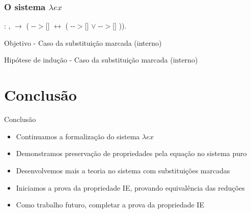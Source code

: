 \documentclass{beamer}
\begin{document}
\begin{frame}
\frametitle{O sistema $\lambda ex$}
    

     :
    \coqdockw{\ensuremath{\forall}}  ,
      \ensuremath{\rightarrow} (
    -{}-$>$[]  \ensuremath{\leftrightarrow} (
    -{}-$>$[]  \ensuremath{\lor} 
    -{}-$>$[] )).


\begin{block}{Objetivo - Caso da substituição marcada (interno)}
\end{block}



\begin{block}{Hipótese de indução - Caso da substituição marcada (interno)}
\end{block}

\end{frame}



\section{Conclusão}
\frame{\tableofcontents[currentsection]}

\begin{frame}{Conclusão}

\begin{itemize}
    \item Continuamos a formalização do sistema $\lambda ex$ 
    \item Demonstramos preservação de propriedades pela equação no sistema puro
    \item Desenvolvemos mais a teoria no sistema com substituições marcadas
    \item Iniciamos a prova da propriedade IE, provando equivalência das reduções
    \item Como trabalho futuro, completar a prova da propriedade IE        
        
\end{itemize}
    
\end{frame}
\end{document}
